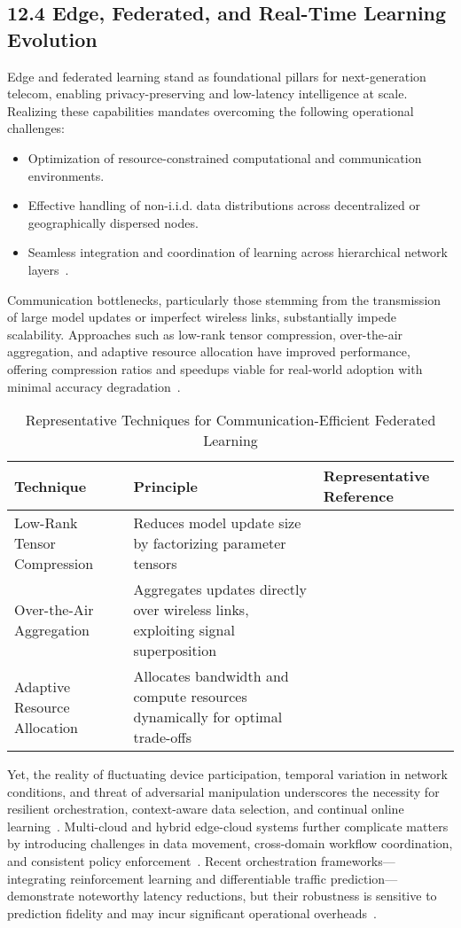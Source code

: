 \documentclass[11pt]{article}
\begin{document}
\subsection{12.4 Edge, Federated, and Real-Time Learning Evolution}

Edge and federated learning stand as foundational pillars for next-generation telecom, enabling privacy-preserving and low-latency intelligence at scale. Realizing these capabilities mandates overcoming the following operational challenges:
\begin{itemize}
    \item Optimization of resource-constrained computational and communication environments.
    \item Effective handling of non-i.i.d. data distributions across decentralized or geographically dispersed nodes.
    \item Seamless integration and coordination of learning across hierarchical network layers~\cite{17,19,23,25,26,39,42,48}.
\end{itemize}

Communication bottlenecks, particularly those stemming from the transmission of large model updates or imperfect wireless links, substantially impede scalability. Approaches such as low-rank tensor compression, over-the-air aggregation, and adaptive resource allocation have improved performance, offering compression ratios and speedups viable for real-world adoption with minimal accuracy degradation~\cite{39,42,48}. 

\begin{table}[ht]
\centering
\caption{Representative Techniques for Communication-Efficient Federated Learning}
\label{tab:fed_techniques}
\begin{tabular}{|l|p{6cm}|p{3cm}|}
\hline
\textbf{Technique} & \textbf{Principle} & \textbf{Representative Reference} \\
\hline
Low-Rank Tensor Compression & Reduces model update size by factorizing parameter tensors & \cite{39} \\
Over-the-Air Aggregation    & Aggregates updates directly over wireless links, exploiting signal superposition & \cite{42} \\
Adaptive Resource Allocation & Allocates bandwidth and compute resources dynamically for optimal trade-offs & \cite{48} \\
\hline
\end{tabular}
\end{table}

Yet, the reality of fluctuating device participation, temporal variation in network conditions, and threat of adversarial manipulation underscores the necessity for resilient orchestration, context-aware data selection, and continual online learning~\cite{25,39}. Multi-cloud and hybrid edge-cloud systems further complicate matters by introducing challenges in data movement, cross-domain workflow coordination, and consistent policy enforcement~\cite{26,48}. Recent orchestration frameworks—integrating reinforcement learning and differentiable traffic prediction—demonstrate noteworthy latency reductions, but their robustness is sensitive to prediction fidelity and may incur significant operational overheads~\cite{42}.
\end{document}
